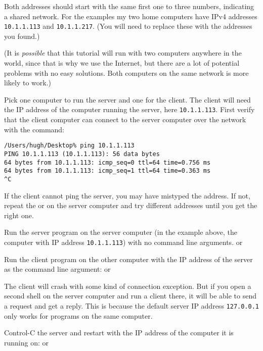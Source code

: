 Both addresses should start with the same first one to three numbers, indicating a
shared network.
For the examples my two home computers have IPv4 addresses \texttt{10.1.1.113}
and \texttt{10.1.1.217}. (You will need to replace these with the addresses you found.)

(It is \emph{possible} that this tutorial will run with two computers anywhere in the world,
since that is why we use the Internet, but there are a lot of potential problems
with no easy solutions. Both computers on the same network is more likely to work.)

Pick one computer to run the server and one for the client. The client will need the IP
address of the computer running the server, here \texttt{10.1.1.113}.
First verify that the client computer can
connect to the server computer over the network with the  command:

\begin{CODE}\begin{verbatim}
/Users/hugh/Desktop% ping 10.1.1.113
PING 10.1.1.113 (10.1.1.113): 56 data bytes
64 bytes from 10.1.1.113: icmp_seq=0 ttl=64 time=0.756 ms
64 bytes from 10.1.1.113: icmp_seq=1 ttl=64 time=0.363 ms
^C
\end{verbatim}\end{CODE}

If the client cannot ping the server, you may have mistyped the address.
If not, repeat the  or  on the server computer and try
different addresses until you get the right one.

\STEP Run the server program on the server computer (in the example above, the computer
with IP address \texttt{10.1.1.113}) with no command line arguments.
or

Run the client program on the other computer with the IP address of the server
as the command line argument:
or

The client will crash with some kind of connection exception. But if you open a second
shell on the server computer and run a client there, it will be able to send a request
and get a reply.
This is because the default server IP address \texttt{127.0.0.1}
only works for programs on the same computer.

\STEP Control-C the server and restart with the IP address of the computer it is running on:
or

